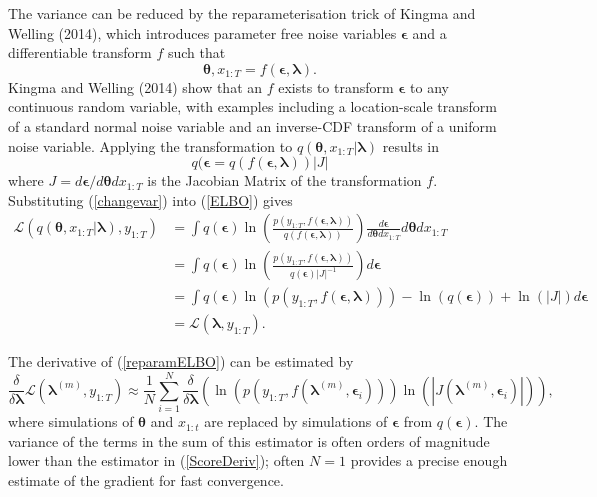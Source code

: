 \documentclass[12pt,a4paper]{article}%
\numberwithin{equation}{section}
\begin{document}
The variance can be reduced by the reparameterisation trick of Kingma and Welling (2014), which introduces parameter free noise variables $\boldsymbol{\epsilon}$ and a differentiable transform $f$ such that
\begin{equation}
\label{Reparam}
\boldsymbol{\theta}, x_{1:T} = f(\boldsymbol{\epsilon}, \boldsymbol{\lambda}).
\end{equation}
Kingma and Welling (2014) show that an $f$ exists to transform $\boldsymbol{\epsilon}$ to any continuous random variable, with examples including a location-scale transform of a standard normal noise variable and an inverse-CDF transform of a uniform noise variable. Applying the transformation to $q(\boldsymbol{\theta}, x_{1:T} | \boldsymbol{\lambda})$ results in
\begin{equation}
\label{changevar}
q(\boldsymbol{\epsilon} = q(f (\boldsymbol{\epsilon}, \boldsymbol{\lambda})) |J|
\end{equation}
where $J = d\boldsymbol{\epsilon}/d\boldsymbol{\theta}dx_{1:T}$ is the Jacobian Matrix of the transformation $f$. Substituting (\ref{changevar}) into (\ref{ELBO}) gives
\begin{align}
\mathcal{L}(q(\boldsymbol{\theta}, x_{1:T} | \boldsymbol{\lambda}), y_{1:T}) &= \int q(\boldsymbol{\epsilon}) \ln \left( \frac{p(y_{1:T},f (\boldsymbol{\epsilon}, \boldsymbol{\lambda}))}{q(f (\boldsymbol{\epsilon}, \boldsymbol{\lambda}))} \right) \frac{ d\boldsymbol{\epsilon}}{d\boldsymbol{\theta}dx_{1:T}}d\boldsymbol{\theta}dx_{1:T} \nonumber \\
&= \int q(\boldsymbol{\epsilon}) \ln \left( \frac{p(y_{1:T},f (\boldsymbol{\epsilon}, \boldsymbol{\lambda}))}{q(\boldsymbol{\epsilon})|J|^{-1}} \right) d\boldsymbol{\epsilon}\nonumber \\
&= \int q(\boldsymbol{\epsilon}) \ln (p(y_{1:T},f (\boldsymbol{\epsilon}, \boldsymbol{\lambda}))) - \ln(q(\boldsymbol{\epsilon})) + \ln(|J|) d\boldsymbol{\epsilon}\nonumber \\
&= \mathcal{L}(\boldsymbol{\lambda}, y_{1:T}). \label{reparamELBO}
\end{align}

The derivative of (\ref{reparamELBO}) can be estimated by
\begin{equation}
\label{ReparamDeriv}
\frac{\delta}{\delta\boldsymbol{\lambda}}\mathcal{L}(\boldsymbol{\lambda}^{(m)}, y_{1:T}) \approx \frac{1}{N}\sum_{i=1}^{N} \frac{\delta}{\delta\boldsymbol{\lambda}} \left( \ln (p(y_{1:T}, f(\boldsymbol{\lambda}^{(m)}, \boldsymbol{\epsilon}_i)))\ln(|J(\boldsymbol{\lambda}^{(m)}, \boldsymbol{\epsilon}_i)|) \right),
\end{equation}
where simulations of $\boldsymbol{\theta}$ and $x_{1:t}$ are replaced by simulations of $\boldsymbol{\epsilon}$ from $q(\boldsymbol{\epsilon})$. The variance of the terms in the sum of this estimator is often orders of magnitude lower than the estimator in (\ref{ScoreDeriv}); often $N = 1$ provides a precise enough estimate of the gradient for fast convergence.
\end{document}
